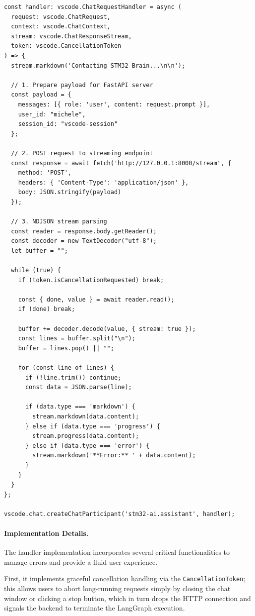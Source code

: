 \begin{lstlisting}[caption={Chat request handler in extension.ts}, label={lst:extension_handler}, mathescape=false]
const handler: vscode.ChatRequestHandler = async (
  request: vscode.ChatRequest,
  context: vscode.ChatContext,
  stream: vscode.ChatResponseStream,
  token: vscode.CancellationToken
) => {
  stream.markdown('Contacting STM32 Brain...\n\n');
  
  // 1. Prepare payload for FastAPI server
  const payload = {
    messages: [{ role: 'user', content: request.prompt }],
    user_id: "michele",
    session_id: "vscode-session"
  };
  
  // 2. POST request to streaming endpoint
  const response = await fetch('http://127.0.0.1:8000/stream', {
    method: 'POST',
    headers: { 'Content-Type': 'application/json' },
    body: JSON.stringify(payload)
  });
  
  // 3. NDJSON stream parsing
  const reader = response.body.getReader();
  const decoder = new TextDecoder("utf-8");
  let buffer = "";
  
  while (true) {
    if (token.isCancellationRequested) break;
    
    const { done, value } = await reader.read();
    if (done) break;
    
    buffer += decoder.decode(value, { stream: true });
    const lines = buffer.split("\n");
    buffer = lines.pop() || "";
    
    for (const line of lines) {
      if (!line.trim()) continue;
      const data = JSON.parse(line);
      
      if (data.type === 'markdown') {
        stream.markdown(data.content);
      } else if (data.type === 'progress') {
        stream.progress(data.content);
      } else if (data.type === 'error') {
        stream.markdown('**Error:** ' + data.content);
      }
    }
  }
};

vscode.chat.createChatParticipant('stm32-ai.assistant', handler);
\end{lstlisting}

\paragraph{Implementation Details.}

The handler implementation incorporates several critical functionalities to manage errors and provide a fluid user experience.

First, it implements graceful cancellation handling via the \texttt{CancellationToken}; this allows users to abort long-running requests simply by closing the chat window or clicking a stop button, which in turn drops the HTTP connection and signals the backend to terminate the LangGraph execution.

